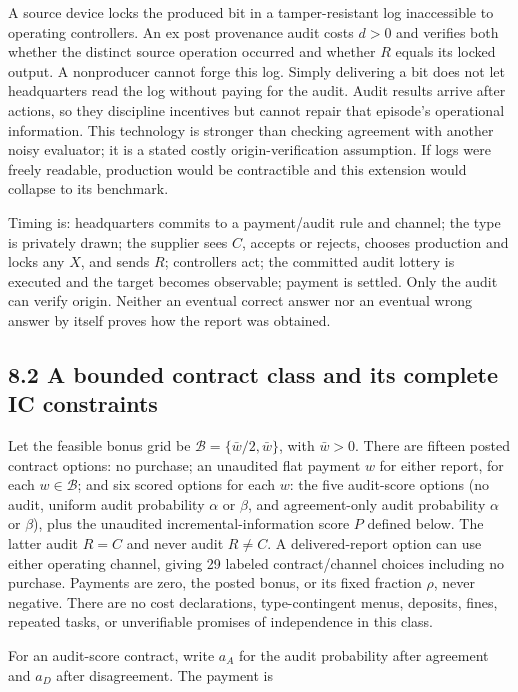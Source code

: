 \documentclass[
  11pt,
]{article}
\begin{document}
A source device locks the produced bit in a tamper-resistant log
inaccessible to operating controllers. An ex post provenance audit costs
\(d>0\) and verifies both whether the distinct source operation occurred
and whether \(R\) equals its locked output. A nonproducer cannot forge
this log. Simply delivering a bit does not let headquarters read the log
without paying for the audit. Audit results arrive after actions, so
they discipline incentives but cannot repair that episode's operational
information. This technology is stronger than checking agreement with
another noisy evaluator; it is a stated costly origin-verification
assumption. If logs were freely readable, production would be
contractible and this extension would collapse to its benchmark.

Timing is: headquarters commits to a payment/audit rule and channel; the
type is privately drawn; the supplier sees \(C\), accepts or rejects,
chooses production and locks any \(X\), and sends \(R\); controllers
act; the committed audit lottery is executed and the target becomes
observable; payment is settled. Only the audit can verify origin.
Neither an eventual correct answer nor an eventual wrong answer by
itself proves how the report was obtained.

\subsection{8.2 A bounded contract class and its complete IC
constraints}\label{a-bounded-contract-class-and-its-complete-ic-constraints}

Let the feasible bonus grid be \(\mathcal B=\{\bar w/2,\bar w\}\), with
\(\bar w>0\). There are fifteen posted contract options: no purchase; an
unaudited flat payment \(w\) for either report, for each
\(w\in\mathcal B\); and six scored options for each \(w\): the five
audit-score options (no audit, uniform audit probability \(\alpha\) or
\(\beta\), and agreement-only audit probability \(\alpha\) or
\(\beta\)), plus the unaudited incremental-information score \(P\)
defined below. The latter audit \(R=C\) and never audit \(R\ne C\). A
delivered-report option can use either operating channel, giving 29
labeled contract/channel choices including no purchase. Payments are
zero, the posted bonus, or its fixed fraction \(\rho\), never negative.
There are no cost declarations, type-contingent menus, deposits, fines,
repeated tasks, or unverifiable promises of independence in this class.

For an audit-score contract, write \(a_A\) for the audit probability
after agreement and \(a_D\) after disagreement. The payment is
\end{document}

